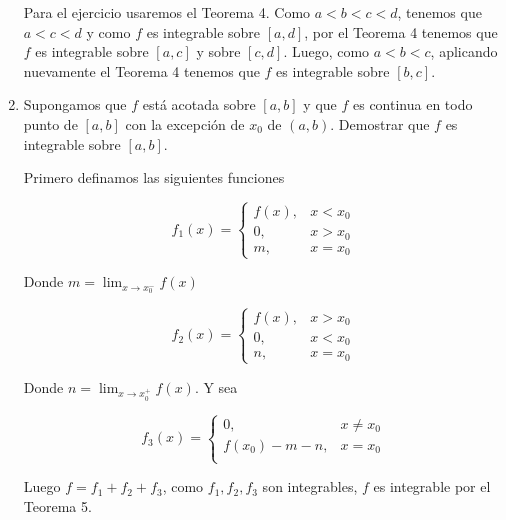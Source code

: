 \documentclass{report}
\begin{document}
\begin{enumerate}[label=\textcolor{NavyBlue}{\textbf{\arabic*.}}]
            Para el ejercicio usaremos el Teorema 4. Como $a < b < c < d$, tenemos que $a<c<d$ y como $f$ es integrable sobre $[a, d]$, por el Teorema 4 tenemos que $f$ es integrable sobre $[a,c]$ y sobre $[c,d]$. Luego, como $a<b<c$, aplicando nuevamente el Teorema 4 tenemos que $f$ es integrable sobre $[b, c]$.

            \setcounter{enumi}{19}
            \item Supongamos que $f$ está acotada sobre $[a,b]$ y que $f$ es continua en todo punto de $[a,b]$ con la excepción de $x_0$ de $(a,b)$. Demostrar que $f$ es integrable sobre $[a,b]$.

            Primero definamos las siguientes funciones

            $$f_1(x) = \begin{cases}
                f(x), & x<x_0\\
                0, & x>x_0\\
                m, & x = x_0
            \end{cases}$$

            Donde $m = \lim_{x \to x_0^-} f(x)$

            $$f_2(x) = \begin{cases}
                f(x), & x>x_0\\
                0, & x<x_0\\
                n, & x = x_0
            \end{cases}$$

            Donde $n = \lim_{x \to x_0^+} f(x)$. Y sea

            $$f_3(x) = \begin{cases}
                0, & x\not=x_0\\
                f(x_0)-m-n, & x=x_0\\
            \end{cases}$$

            Luego $f = f_1 + f_2 + f_3$, como $f_1, f_2, f_3$ son integrables, $f$ es integrable por el Teorema 5.
    \end{enumerate}
\end{document}
